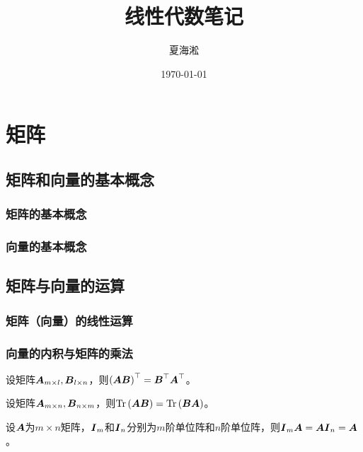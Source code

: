 \documentclass{ctexart}
\author{夏海淞}
\title{线性代数笔记}
\date{\today}
\begin{document}
\maketitle
\tableofcontents
\section{矩阵}

\subsection{矩阵和向量的基本概念}

\subsubsection*{矩阵的基本概念}

\subsubsection*{向量的基本概念}

\subsection{矩阵与向量的运算}

\subsubsection*{矩阵（向量）的线性运算}

\subsubsection*{向量的内积与矩阵的乘法}

\begin{property}
    设矩阵\(\boldsymbol{A}_{m\times l},\boldsymbol{B}_{l\times n}\)，则\(\left( \boldsymbol{A}\boldsymbol{B} \right)^\top=\boldsymbol{B}^\top\boldsymbol{A}^\top\)。
\end{property}

\begin{property}
    设矩阵\(\boldsymbol{A}_{m\times n},\boldsymbol{B}_{n\times m}\)，则\(\mathrm{Tr}\left( \boldsymbol{A}\boldsymbol{B} \right)=\mathrm{Tr}\left( \boldsymbol{B}\boldsymbol{A} \right)\)。
\end{property}

\begin{property}
    设\(\boldsymbol{A}\)为\(m\times n\)矩阵，\(\boldsymbol{I}_m\)和\(\boldsymbol{I}_n\)分别为\(m\)阶单位阵和\(n\)阶单位阵，则\(\boldsymbol{I}_m\boldsymbol{A}=\boldsymbol{A}\boldsymbol{I}_n=\boldsymbol{A}\)。
\end{property}
\end{document}

